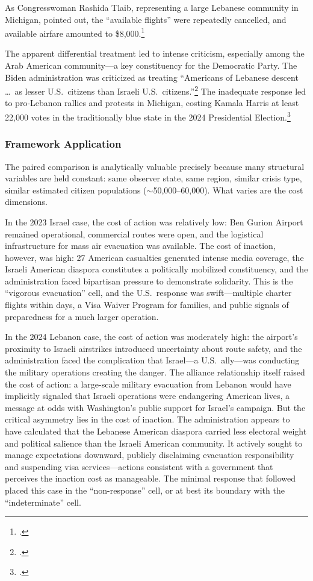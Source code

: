 \documentclass[12pt]{article}
\begin{document}
As Congresswoman Rashida Tlaib, representing a large Lebanese community in Michigan, pointed out, the ``available flights'' were repeatedly cancelled, and available airfare amounted to \$8,000.\footnote{\citet{Harb2024}.}

The apparent differential treatment led to intense criticism, especially among the Arab American community---a key constituency for the Democratic Party. The Biden administration was criticized as treating ``Americans of Lebanese descent \ldots\ as lesser U.S.\ citizens than Israeli U.S.\ citizens.''\footnote{\citet{Cappelletti2024}.} The inadequate response led to pro-Lebanon rallies and protests in Michigan, costing Kamala Harris at least 22,000 votes in the traditionally blue state in the 2024 Presidential Election.\footnote{\citet{Perkins2024}.}

\subsubsection{Framework Application}

The paired comparison is analytically valuable precisely because many structural variables are held constant: same observer state, same region, similar crisis type, similar estimated citizen populations ($\sim$50,000--60,000). What varies are the cost dimensions.

In the 2023 Israel case, the cost of action was relatively low: Ben Gurion Airport remained operational, commercial routes were open, and the logistical infrastructure for mass air evacuation was available. The cost of inaction, however, was high: 27 American casualties generated intense media coverage, the Israeli American diaspora constitutes a politically mobilized constituency, and the administration faced bipartisan pressure to demonstrate solidarity. This is the ``vigorous evacuation'' cell, and the U.S.\ response was swift---multiple charter flights within days, a Visa Waiver Program for families, and public signals of preparedness for a much larger operation.

In the 2024 Lebanon case, the cost of action was moderately high: the airport's proximity to Israeli airstrikes introduced uncertainty about route safety, and the administration faced the complication that Israel---a U.S.\ ally---was conducting the military operations creating the danger. The alliance relationship itself raised the cost of action: a large-scale military evacuation from Lebanon would have implicitly signaled that Israeli operations were endangering American lives, a message at odds with Washington's public support for Israel's campaign. But the critical asymmetry lies in the cost of inaction. The administration appears to have calculated that the Lebanese American diaspora carried less electoral weight and political salience than the Israeli American community. It actively sought to manage expectations downward, publicly disclaiming evacuation responsibility and suspending visa services---actions consistent with a government that perceives the inaction cost as manageable. The minimal response that followed placed this case in the ``non-response'' cell, or at best its boundary with the ``indeterminate'' cell.
\end{document}
